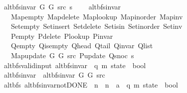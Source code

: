 \begin{isabellebody}
\ \ {\isachardoublequoteopen}alt{\isacharunderscore}{\kern0pt}bfs{\isacharunderscore}{\kern0pt}invar{\isacharprime}{\kern0pt}\ G{}\ G{}\ src\ s\ {\isasymequiv}\isanewline
\ \ \ alt{\isacharunderscore}{\kern0pt}bfs{\isacharunderscore}{\kern0pt}invar\isanewline
\ \ \ \ Map{\isacharunderscore}{\kern0pt}empty\ Map{\isacharunderscore}{\kern0pt}delete\ Map{\isacharunderscore}{\kern0pt}lookup\ Map{\isacharunderscore}{\kern0pt}inorder\ Map{\isacharunderscore}{\kern0pt}inv\isanewline
\ \ \ \ Set{\isacharunderscore}{\kern0pt}empty\ Set{\isacharunderscore}{\kern0pt}insert\ Set{\isacharunderscore}{\kern0pt}delete\ Set{\isacharunderscore}{\kern0pt}isin\ Set{\isacharunderscore}{\kern0pt}inorder\ Set{\isacharunderscore}{\kern0pt}inv\isanewline
\ \ \ \ P{\isacharunderscore}{\kern0pt}empty\ P{\isacharunderscore}{\kern0pt}delete\ P{\isacharunderscore}{\kern0pt}lookup\ P{\isacharunderscore}{\kern0pt}invar\isanewline
\ \ \ \ Q{\isacharunderscore}{\kern0pt}empty\ Q{\isacharunderscore}{\kern0pt}is{\isacharunderscore}{\kern0pt}empty\ Q{\isacharunderscore}{\kern0pt}head\ Q{\isacharunderscore}{\kern0pt}tail\ Q{\isacharunderscore}{\kern0pt}invar\ Q{\isacharunderscore}{\kern0pt}list\isanewline
\ \ \ \ Map{\isacharunderscore}{\kern0pt}update\ G{}\ G{}\ src\ P{\isacharunderscore}{\kern0pt}update\ Q{\isacharunderscore}{\kern0pt}snoc\ s{\isachardoublequoteclose}\isanewline
\isanewline
{}\isamarkupfalse%
\ {\isacharparenleft}{\kern0pt}\ alt{\isacharunderscore}{\kern0pt}bfs{\isacharunderscore}{\kern0pt}valid{\isacharunderscore}{\kern0pt}input{\isacharparenright}{\kern0pt}\ alt{\isacharunderscore}{\kern0pt}bfs{\isacharunderscore}{\kern0pt}invar{\isacharprime}{\kern0pt}{\isacharprime}{\kern0pt}\ {\isacharcolon}{\kern0pt}{\isacharcolon}{\kern0pt}\ {\isachardoublequoteopen}{\isacharparenleft}{\kern0pt}{\isacharprime}{\kern0pt}q{\isacharcomma}{\kern0pt}\ {\isacharprime}{\kern0pt}m{\isacharparenright}{\kern0pt}\ state\ {\isasymRightarrow}\ bool{\isachardoublequoteclose}\ \isanewline
\ \ {\isachardoublequoteopen}alt{\isacharunderscore}{\kern0pt}bfs{\isacharunderscore}{\kern0pt}invar{\isacharprime}{\kern0pt}{\isacharprime}{\kern0pt}\ {\isasymequiv}\ alt{\isacharunderscore}{\kern0pt}bfs{\isacharunderscore}{\kern0pt}invar{\isacharprime}{\kern0pt}\ G{}\ G{}\ src{\isachardoublequoteclose}\isanewline
\isanewline
{}\isamarkupfalse%
\ {\isacharparenleft}{\kern0pt}\ alt{\isacharunderscore}{\kern0pt}bfs{\isacharparenright}{\kern0pt}\ alt{\isacharunderscore}{\kern0pt}bfs{\isacharunderscore}{\kern0pt}invar{\isacharunderscore}{\kern0pt}not{\isacharunderscore}{\kern0pt}DONE{\isacharprime}{\kern0pt}\ {\isacharcolon}{\kern0pt}{\isacharcolon}{\kern0pt}\ {\isachardoublequoteopen}{\isacharprime}{\kern0pt}n\ {\isasymRightarrow}\ {\isacharprime}{\kern0pt}n\ {\isasymRightarrow}\ {\isacharprime}{\kern0pt}a\ {\isasymRightarrow}\ {\isacharparenleft}{\kern0pt}{\isacharprime}{\kern0pt}q{\isacharcomma}{\kern0pt}\ {\isacharprime}{\kern0pt}m{\isacharparenright}{\kern0pt}\ state\ {\isasymRightarrow}\ bool{\isachardoublequoteclose}\ \isanewline

\end{isabellebody}
